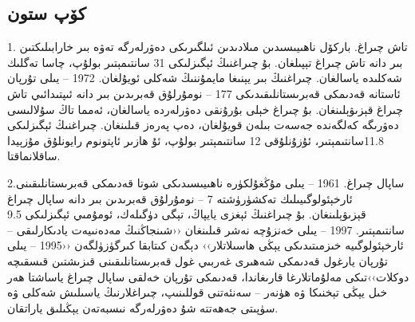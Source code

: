 \documentclass[24]{article}
\begin{document}
\begin{Arabic}

\newfontfamily{}
\section{\textarabic{كۆپ ستون }}
\begin{multicols}{3}
1. تاش چىراغ. باركۆل ناھىيىسىدىن مىلادىدىن ئىلگىرىكى دەۋرلەرگە تەۋە بىر خارابىلىكتىن بىر دانە تاش چىراغ تېپىلغان. بۇ چىراغنىڭ ئېگىزلىكى 31 سانتىمېتىر بولۇپ، چاسا تەگلىك شەكلىدە ياسالغان. چىراغنىڭ بىر يېنىغا مايمۇننىڭ شەكلى ئويۇلغان. 1972 – يىلى تۇرپان ئاستانە قەدىمكى قەبرىستانلىقىدىكى 177 – نومۇرلۇق قەبرىدىن بىر دانە ئىپتىدائىي تاش چىراغ قېزىۋېلىنغان. بۇ چىراغ خېلى بۇرۇنقى دەۋرلەردە ياسالغان، ئەمما تاڭ سۇلالىسى دەۋرىگە كەلگەندە جەسەت بىلەن قويۇلغان، دەپ پەرەز قىلىنغان. چىراغنىڭ ئېگىزلىكى 11.8سانتىمېتىر، ئۇزۇنلۇقى 12 سانتىمېتىر بولۇپ، ئۇ ھازىر ئاپتونوم رايونلۇق مۇزېيدا ساقلانماقتا.

2.ساپال {\huge{چىراغ}}. 1961 – يىلى مۇڭغۇلكۈرە ناھىيىسىدىكى شوتا قەدىمكى قەبرىستانلىقىنى ئارخېئولوگىيىلىك تەكشۈرۈشتە 7 – نومۇرلۇق قەبرىدىن بىر دانە ساپال چىراغ قېزىۋېلىنغان. بۇ چىراغنىڭ ئېغزى يايپاڭ، تېگى دۈگىلەك، ئومۇمىي ئېگىزلىكى 9.5 سانتىمېتىر. 1997 – يىلى خەنزۇچە نەشر قىلىنغان ‹‹شىنجاڭنىڭ مەدەنىيەت يادىكارلىقى – ئارخېئولوگىيە خىزمىتىدىكى يېڭى ھاسىلاتلار›› دېگەن كىتابقا كىرگۈزۈلگەن ‹‹1995 – يىلى تۇرپان يارغول قەدىمكى شەھىرى غەربىي غول قەبرىستانلىقىنى قىزىشتىن قىسقىچە دوكلات››تىكى مەلۇماتلارغا قارىغاندا، قەدىمكى تۇرپان خەلقى ساپال چىراغ ياساشتا ھەر خىل يېڭى تېخنىكا ۋە ھۈنەر – سەنئەتنى قوللىنىپ، چىراغلارنىڭ ياسىلىش شەكلى ۋە سۈپىتى جەھەتتە شۇ دەۋرلەرگە نىسبەتەن يېڭىلىق ياراتقان.
\end{multicols}
\end{Arabic}
\end{document}
